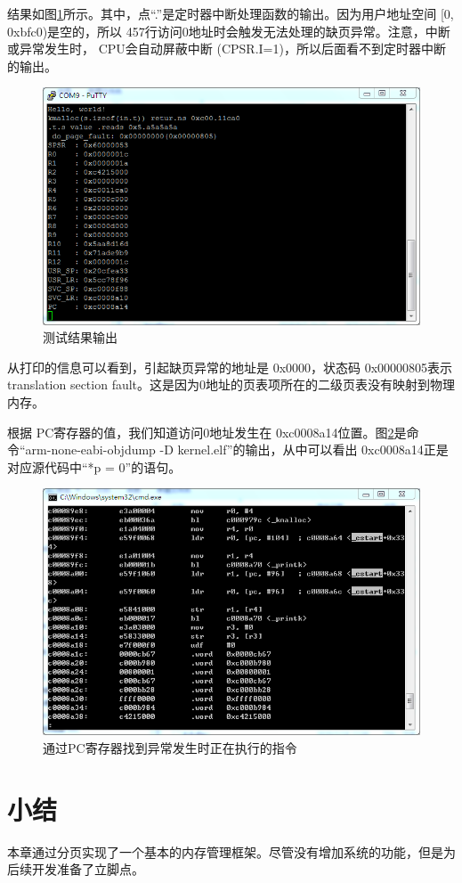 \documentclass[main.tex]{subfiles}
\begin{document}
\begin{CJK*}{UTF8}{song}
结果如图\ref{figure:4-10}所示。其中，点“.”是定时器中断处理函数的输出。因为用户地址空间 [0, 0xbfc0)是空的，所以 457行访问0地址时会触发无法处理的缺页异常。注意，中断或异常发生时， CPU会自动屏蔽中断 (CPSR.I=1)，所以后面看不到定时器中断的输出。

\begin{figure}[htp]
\centering
\includegraphics[scale=0.5]{figures/4-10}
\caption{测试结果输出}
\label{figure:4-10}
\end{figure}

从打印的信息可以看到，引起缺页异常的地址是 0x0000，状态码 0x0000\-0805表示 translation section fault。这是因为0地址的页表项所在的二级页表没有映射到物理内存。

\par
根据 PC寄存器的值，我们知道访问0地址发生在 0xc000\-8a14位置。图\ref{figure:4-11}是命令“arm-\-none-\-eabi-\-objdump -D kernel.elf”的输出，从中可以看出 0xc000\-8a14正是对应源代码中“*p = 0”的语句。

\begin{figure}[htp]
\centering
\includegraphics[scale=0.5]{figures/4-11}
\caption{通过PC寄存器找到异常发生时正在执行的指令}
\label{figure:4-11}
\end{figure}

\section{小结}
本章通过分页实现了一个基本的内存管理框架。尽管没有增加系统的功能，但是为后续开发准备了立脚点。

\clearpage
\ifxetex\else\end{CJK*}\fi
\end{document}
